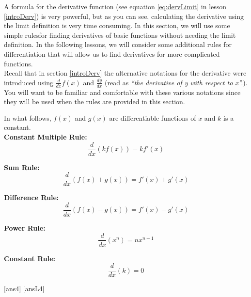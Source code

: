 \noindent A formula for the derivative function (see equation \ref{eq:dervLimit} in lesson \ref{introDerv}) is very powerful, but as you can see, calculating the derivative using the limit definition is very time consuming. In this section, we will use some simple rules\footnotemark for finding derivatives of basic functions without needing the limit definition. In the following lessons, we will consider some additional rules for differentiation that will allow us to find derivatives for more complicated functions.\\
\noindent Recall that in section \ref{introDerv} the alternative notations for the derivative were introduced using \(\displaystyle\frac{d}{dx}f(x)\) and \(\displaystyle\frac{dy}{dx}\) (read as \emph{“the derivative of y with respect to x”.}). You will want to be familiar and comfortable with these various notations since they will be used when the rules are provided in this section.
\begin{tcolorbox}[title = {Differentiation Rules: Basic Rules}]

\noindent In what follows, $f(x)$ and $g(x)$ are differentiable functions of $x$ and $k$ is a constant.\\

\textbf{Constant Multiple Rule:}
\begin{equation}\label{eq:constantMultiple}
\frac{d}{dx}(kf(x))=kf'(x)
\end{equation}

\textbf{Sum Rule:}
\begin{equation}\label{eq:SumRule}
\frac{d}{dx}(f(x)+g(x))=f'(x)+g'(x)
\end{equation}

\textbf{Difference Rule:}
\begin{equation}\label{eq:DiffRule}
\frac{d}{dx}(f(x)-g(x))=f'(x)-g'(x)
\end{equation}

\textbf{Power Rule:}
\begin{equation}\label{eq:PowerRule}
\frac{d}{dx}(x^n)=nx^{n-1}
\end{equation}

\textbf{Constant Rule:}\footnotemark
\begin{equation}\label{eq:ConstantRule}
\frac{d}{dx}(k)=0
\end{equation}

\end{tcolorbox}
[ans4]
[ansL4]

